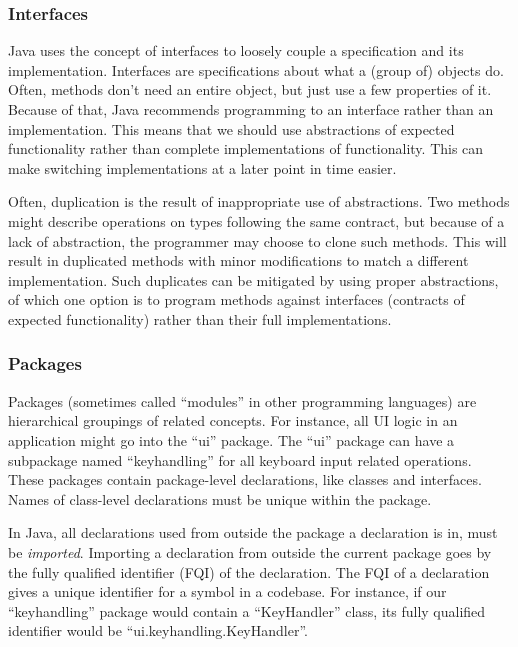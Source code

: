 \subsubsection{Interfaces}
Java uses the concept of interfaces to loosely couple a specification and its implementation. Interfaces are specifications about what a (group of) objects do. Often, methods don't need an entire object, but just use a few properties of it. Because of that, Java recommends programming to an interface rather than an implementation. This means that we should use abstractions of expected functionality rather than complete implementations of functionality. This can make switching implementations at a later point in time easier.

Often, duplication is the result of inappropriate use of abstractions. Two methods might describe operations on types following the same contract, but because of a lack of abstraction, the programmer may choose to clone such methods. This will result in duplicated methods with minor modifications to match a different implementation. Such duplicates can be mitigated by using proper abstractions, of which one option is to program methods against interfaces (contracts of expected functionality) rather than their full implementations.

\subsubsection{Packages}
Packages (sometimes called ``modules'' in other programming languages) are hierarchical groupings of related concepts. For instance, all UI logic in an application might go into the ``ui'' package. The ``ui'' package can have a subpackage named ``keyhandling'' for all keyboard input related operations. These packages contain package-level declarations, like classes and interfaces. Names of class-level declarations must be unique within the package. %

In Java, all declarations used from outside the package a declaration is in, must be \textit{imported}. Importing a declaration from outside the current package goes by the fully qualified identifier (FQI) of the declaration. The FQI of a declaration gives a unique identifier for a symbol in a codebase. For instance, if our ``keyhandling'' package would contain a ``KeyHandler'' class, its fully qualified identifier would be ``ui.keyhandling.KeyHandler''.

